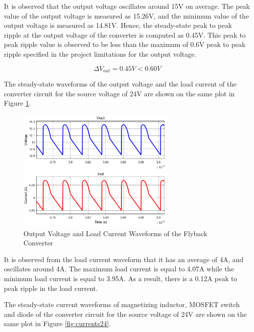 It is observed that the output voltage oscillates around 15V on average. The peak value of the output voltage is measured as 15.26V, and the minimum value of the output voltage is measured as 14.81V. Hence, the steady-state peak to peak ripple at the output voltage of the converter is computed as 0.45V. This peak to peak ripple value is observed to be less than the maximum of 0.6V peak to peak ripple specified in the project limitations for the output voltage.

$$ \Delta V_{out} = 0.45V < 0.60V $$

The steady-state waveforms of the output voltage and the load current of the converter circuit for the source voltage of 24V are shown on the same plot in Figure \ref{fig:viout_24}.

\begin{figure}[H]
\begin{center}
\includegraphics[width=0.7\textwidth]{figures/V_I_out_24.png}
\caption{Output Voltage and Load Current Waveforms of the Flyback Converter}
\label{fig:viout_24}
\end{center}
\end{figure}

It is observed from the load current waveform that it has an average of 4A, and oscillates around 4A. The maximum load current is equal to 4.07A while the minimum load current is equal to 3.95A. As a result, there is a 0.12A peak to peak ripple in the load current.

The steady-state current waveforms of magnetizing inductor, MOSFET switch and diode of the converter circuit for the source voltage of 24V are shown on the same plot in Figure \ref{fig:currents24}.

